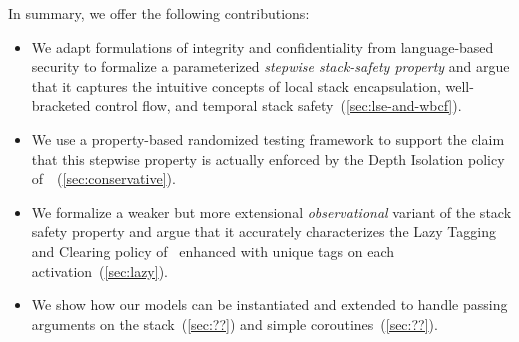 \documentclass[acmsmall,review,anonymous]{acmart}\settopmatter{printfolios=true,printccs=false,printacmref=false}
\begin{document}

In summary, we offer the following contributions: 
\begin{itemize}
\item
  We adapt formulations of integrity and confidentiality from
  language-based security
  to formalize a parameterized {\em stepwise stack-safety property} and argue that
  it captures the intuitive concepts of local stack encapsulation, well-bracketed control
  flow, and temporal stack safety~(\cref{sec:lse-and-wbcf}).
\item
  We use a property-based randomized testing framework to support the claim
  that this stepwise property is actually enforced by the Depth Isolation policy
  of~\citet{DBLP:conf/sp/RoesslerD18}~(\cref{sec:conservative}).
\item
  We formalize a weaker but more extensional \emph{observational} variant of the
  stack safety property and argue that it accurately characterizes
  the Lazy Tagging and Clearing policy of~\citet{DBLP:conf/sp/RoesslerD18}
  enhanced with unique tags on each activation~(\cref{sec:lazy}).
\item
  We show how our models can be instantiated and extended to handle passing
  arguments on the stack~(\cref{sec:??}) and simple
  coroutines~(\cref{sec:??}).
%


\end{itemize}
\end{document}
